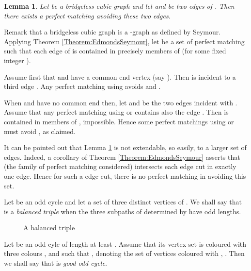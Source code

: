 \documentclass{elsart}
\theoremstyle{plain} \theoremheaderfont{\scshape}
\newtheorem{Lem}[Thm]{\bf Lemma}
\newenvironment{Prf}{{\bf \noindent Proof } }{\hfill\\}
\begin{document}
\begin{Lem}\label{Lemma:TwoEdgesAvoiding} Let  be a bridgeless
cubic graph and let  and  be two edges of . Then
there exists a perfect matching avoiding these two edges.
\end{Lem}
\begin{Prf}  Remark that a bridgeless cubic graph is a -graph as defined by Seymour.
Applying Theorem \ref{Theorem:EdmondsSeymour}, let  be a
set of perfect matching such that each edge of  is contained in
precisely  members of  (for some fixed integer ).

Assume first that  and  have a common end vertex (say ).
Then  is incident to a third edge . Any perfect matching
using  avoids  and .

When  and  have no common end then, let  and  be the
two edges incident with . Assume that any perfect matching using
 or  contains also the edge . Then  is contained in
 members of , impossible. Hence some perfect
matchings using  or  must avoid , as claimed.
\end{Prf}

It can be pointed out that Lemma \ref{Lemma:TwoEdgesAvoiding} is not
extendable, so easily, to a larger set of edges. Indeed, a corollary
of Theorem \ref{Theorem:EdmondsSeymour} asserts that 
(the family of perfect matching considered) intersects each edge
cut in exactly one edge. Hence for such a edge cut, there is no
perfect matching in  avoiding this set.

Let  be an odd cycle and let  a set of three
distinct vertices of . We shall say that  is a {\em balanced
triple} when the three subpaths of  determined by  have odd
lengths.

\begin{figure}[t]
\centering {} \hsize \noindent
{} \caption{A balanced triple}
\label{Figure:BalancedTriple}
\end{figure}

Let  be an odd cyle of length at least .
Assume that its vertex set is coloured with three colours , 
and  such that , 
denoting the set of vertices coloured with , . Then we
shall say that  is {\em good odd cycle}.
\end{document}
